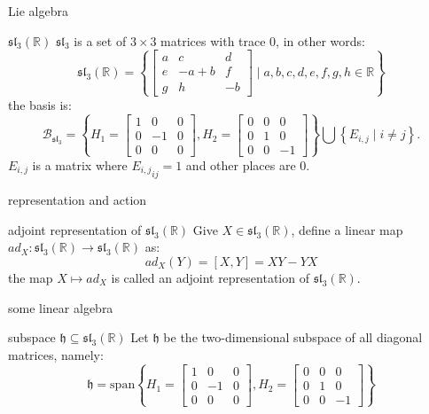 \documentclass{beamer}
\newcommand{\R}{\mathbb{R}}
\newcounter{mytheorem}[section] \def\themytheorem{\thesection.\arabic{mytheorem}}
\begin{document}
\addtocounter{mytheorem}{-1}
\begin{frame}{Lie algebra}

\begin{exm}{$\mathfrak{sl}_3(\R)$}{}
	$\mathfrak{sl}_{3}$ is a set of $3 \times 3$ matrices with trace 0, in other words:  \[
		\mathfrak{sl}_{3}(\R) = \left\{ \begin{bmatrix} a & c & d \\
		e & -a+b & f \\ g & h & -b\end{bmatrix} \mid a,b,c,d,e,f,g,h \in \R \right\} 
	\] 
\tcblower
the basis is: \[
	\mathcal{B}_{\mathfrak{sl}_{3}} = \left\{ H_1 = \begin{bmatrix} 1 & 0 &0 \\ 0 & -1 & 0 \\ 0 &0 &0 \end{bmatrix}, H_2 = \begin{bmatrix} 0 &0 &0 \\ 0 &1&0 \\ 0&0&-1 \end{bmatrix}   \right\} \bigcup \left\{ E_{i,j} \mid i \neq j\right\}. 
\] $E_{i,j}$ is a matrix where ${E_{i,j}}_{ij} = 1$ and other places are $0$.
\end{exm}

\end{frame}

\begin{frame}{representation and action}
	\begin{defn}{adjoint representation of $\mathfrak{sl}_3(\R)$}{}
		Give $X \in \mathfrak{sl}_3(\R)$, define a linear map $ad_X : \mathfrak{sl}_3(\R) \to \mathfrak{sl}_3(\R)$ as: \[
			ad_X(Y) = [X,Y] = XY - YX
		\] the map $X \mapsto ad_X$ is called an adjoint representation of $\mathfrak{sl}_3(\R)$.
	\end{defn} 
\end{frame}

\begin{frame}{some linear algebra}
	\begin{defn}{subspace $\mathfrak{h} \subseteq \mathfrak{sl}_3(\R)$}{}
		Let  $\mathfrak{h}$ be the two-dimensional subspace of all diagonal matrices, namely:  \[
			\mathfrak{h} = \text{span}{\left\{ H_1 = \begin{bmatrix} 1 & 0 &0 \\ 0 & -1 & 0 \\ 0 &0 &0 \end{bmatrix}, H_2 = \begin{bmatrix} 0 &0 &0 \\ 0 &1&0 \\ 0&0&-1 \end{bmatrix}   \right\} }
		\] 
	\end{defn}
\end{frame}
\end{document}
